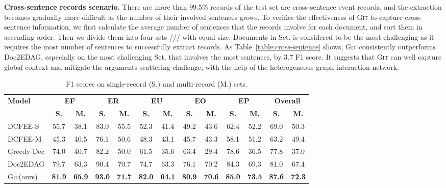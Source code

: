 \documentclass[11pt,a4paper]{article}
\newcommand{\modelname}{\textsc{Git}\xspace}
\begin{document}
\textbf{Cross-sentence records scenario.}
There are more than $99.5\%$ records of the test set are cross-sentence event records, and the extraction becomes gradually more difficult as the number of their involved sentences grows.
To verifies the effectiveness of \modelname to capture cross-sentence information, we first calculate the average number of sentences that the records involve for each document, and sort them in ascending order.
Then we divide them into four sets \uppercase\expandafter{}/\uppercase\expandafter{}/\uppercase\expandafter{}/\uppercase\expandafter{} with equal size.
Documents in Set. \uppercase\expandafter{} is considered to be the most challenging as it requires the most number of sentences to successfully extract records.
As Table~\ref{table:cross-sentence} shows, \modelname consistently outperforms Doc2EDAG, especially on the most challenging Set. \uppercase\expandafter{} that involves the most sentences, by $3.7$ F1 score.
It suggests that \modelname can well capture global context and mitigate the arguments-scattering challenge, with the help of the heterogeneous graph interaction network.

\begin{table*}[htbp]
\centering
\begin{tabular}{lcccccccccccc}
\toprule
\multirow{2}{*}{\bf Model} & \multicolumn{2}{c}{\bf EF} & \multicolumn{2}{c}{\bf ER} & \multicolumn{2}{c}{\bf EU} & \multicolumn{2}{c}{\bf EO} & \multicolumn{2}{c}{\bf EP} & \multicolumn{2}{c}{\bf Overall}\\ 
\cmidrule(lr){2-3} 
\cmidrule(lr){4-5}
\cmidrule(lr){6-7}
\cmidrule(lr){8-9}
\cmidrule(lr){10-11}
\cmidrule(lr){12-13}
~ & \bf S. & \bf M. & \bf S. &  \bf M. & \bf S. &  \bf M. & \bf S. &  \bf M. & \bf S. &  \bf M. & \bf S. &  \bf M. \\
\midrule
DCFEE-S & 55.7 & 38.1 & 83.0 & 55.5 & 52.3 & 41.4 & 49.2 & 43.6 & 62.4 & 52.2 & 69.0 & 50.3\\
DCFEE-M & 45.3 & 40.5 & 76.1 & 50.6 & 48.3 & 43.1 & 45.7 & 43.3 & 58.1 & 51.2 & 63.2 & 49.4 \\
Greedy-Dec & 74.0 & 40.7 & 82.2 & 50.0 & 61.5 & 35.6 & 63.4 & 29.4 & 78.6 & 36.5 & 77.8 & 37.0 \\
Doc2EDAG & 79.7 & 63.3 & 90.4 & 70.7 & 74.7 & 63.3 & 76.1 & 70.2 & 84.3 & 69.3 & 81.0 & 67.4\\
\midrule
\modelname (ours) & \textbf{81.9} & \textbf{65.9} & \textbf{93.0} & \textbf{71.7} & \textbf{82.0} & \textbf{64.1} & \textbf{80.9} & \textbf{70.6} & \textbf{85.0} & \textbf{73.5} & \textbf{87.6} & \textbf{72.3} \\
\bottomrule
\end{tabular}
\caption{F1 scores on single-record (S.) and multi-record (M.) sets.}
\label{table:single-vs-multi}
\end{table*}
\end{document}
